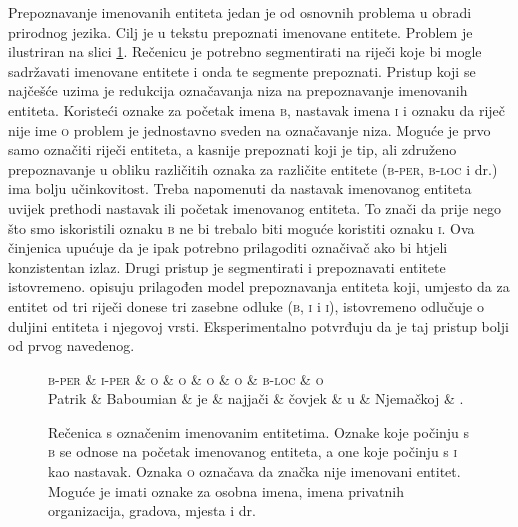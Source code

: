 Prepoznavanje imenovanih entiteta  jedan je od
osnovnih problema u obradi prirodnog jezika. Cilj je u tekstu prepoznati
imenovane entitete. Problem je ilustriran na slici
\ref{fig:namedentityrecognition}. Rečenicu je potrebno segmentirati na riječi
koje bi mogle sadržavati imenovane entitete i onda te segmente prepoznati.
Pristup koji se najčešće uzima je redukcija označavanja niza na prepoznavanje
imenovanih entiteta. Koristeći oznake za početak imena \textsc{b}, nastavak
imena \textsc{i} i oznaku da riječ nije ime \textsc{o} problem je jednostavno
sveden na označavanje niza. Moguće je prvo samo označiti riječi entiteta, a
kasnije prepoznati koji je tip, ali združeno prepoznavanje u obliku različitih
oznaka za različite entitete (\textsc{b-per}, \textsc{b-loc} i dr.) ima bolju
učinkovitost. Treba napomenuti da nastavak imenovanog entiteta uvijek prethodi
nastavak ili početak imenovanog entiteta. To znači da prije nego što smo
iskoristili oznaku \textsc{b} ne bi trebalo biti moguće koristiti oznaku
\textsc{i}. Ova činjenica upućuje da je ipak potrebno prilagoditi označivač ako
bi htjeli konzistentan izlaz. Drugi pristup je segmentirati i prepoznavati
entitete istovremeno. \citet{sarawagi2004semi} opisuju prilagođen model
prepoznavanja entiteta koji, umjesto da za entitet od tri riječi donese tri
zasebne odluke (\textsc{b}, \textsc{i} i \textsc{i}), istovremeno odlučuje o
duljini entiteta i njegovoj vrsti. Eksperimentalno potvrđuju da je taj pristup
bolji od prvog navedenog.

\begin{figure}[H]
\centering
\begin{dependency}
\begin{deptext}
  \textsc{b-per} \& \textsc{i-per} \& \textsc{o} \& \textsc{o} \& \textsc{o} \& \textsc{o} \& \textsc{b-loc} \& \textsc{o} \\
  Patrik         \& Baboumian      \& je         \& najjači    \& čovjek     \& u          \& Njemačkoj      \& .          \\
\end{deptext}
\end{dependency}
\caption[Rečenica s označenim imenovanim entitetima.]{Rečenica s označenim
imenovanim entitetima. Oznake koje počinju s \textsc{b} se odnose na početak
imenovanog entiteta, a one koje počinju s \textsc{i} kao nastavak. Oznaka
\textsc{o} označava da značka nije imenovani entitet. Moguće je imati oznake za
osobna imena, imena privatnih organizacija, gradova, mjesta i dr.}
\label{fig:namedentityrecognition}
\end{figure}

